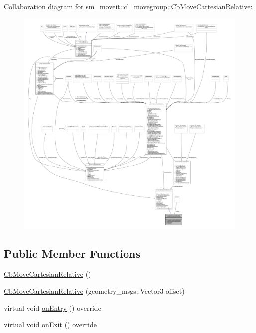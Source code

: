 Collaboration diagram for sm\+\_\+moveit\+:\+:cl\+\_\+movegroup\+:\+:Cb\+Move\+Cartesian\+Relative\+:
\nopagebreak
\begin{figure}[H]
\begin{center}
\leavevmode
\includegraphics[width=350pt]{classsm__moveit_1_1cl__movegroup_1_1CbMoveCartesianRelative__coll__graph}
\end{center}
\end{figure}
\subsection*{Public Member Functions}
\begin{DoxyCompactItemize}
\item 
\hyperlink{classsm__moveit_1_1cl__movegroup_1_1CbMoveCartesianRelative_a0f2947c4d3b9a1a3e43031e0d3d55e1f}{Cb\+Move\+Cartesian\+Relative} ()
\item 
\hyperlink{classsm__moveit_1_1cl__movegroup_1_1CbMoveCartesianRelative_a750939f120f462a0af55415007cf656a}{Cb\+Move\+Cartesian\+Relative} (geometry\+\_\+msgs\+::\+Vector3 offset)
\item 
virtual void \hyperlink{classsm__moveit_1_1cl__movegroup_1_1CbMoveCartesianRelative_a92286b179e2b55d93f0c0195a9f05039}{on\+Entry} () override
\item 
virtual void \hyperlink{classsm__moveit_1_1cl__movegroup_1_1CbMoveCartesianRelative_ace52bd9a2668c34f1046458c9d3257fa}{on\+Exit} () override
\end{DoxyCompactItemize}
